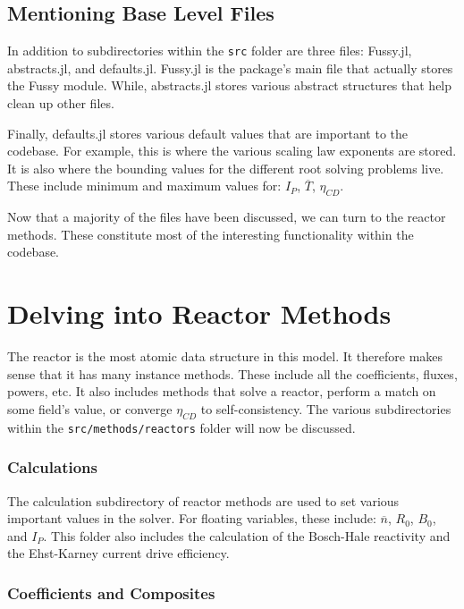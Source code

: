 \subsection{Mentioning Base Level Files}

In addition to subdirectories within the \texttt{src} folder are three files: Fussy.jl, abstracts.jl, and defaults.jl. Fussy.jl is the package's main file that actually stores the Fussy module. While, abstracts.jl stores various abstract structures that help clean up other files.

Finally, defaults.jl stores various default values that are important to the codebase. For example, this is where the various scaling law exponents are stored. It is also where the bounding values for the different root solving problems live. These include minimum and maximum values for: $I_P$, $\overline T$, $\eta_{CD}$.

Now that a majority of the files have been discussed, we can turn to the reactor methods. These constitute most of the interesting functionality within the codebase. 

\section{Delving into Reactor Methods}

The reactor is the most atomic data structure in this model. It therefore makes sense that it has many instance methods. These include all the coefficients, fluxes, powers, etc. It also includes methods that solve a reactor, perform a match on some field's value, or converge $\eta_{CD}$ to self-consistency. The various subdirectories within the \texttt{src/methods/reactors} folder will now be discussed.

\subsubsection{Calculations}

The calculation subdirectory of reactor methods are used to set various important values in the solver. For floating variables, these include: $\overline n$, $R_0$, $B_0$, and $I_P$. This folder also includes the calculation of the Bosch-Hale reactivity and the Ehst-Karney current drive efficiency. 

\subsubsection{Coefficients and Composites}

